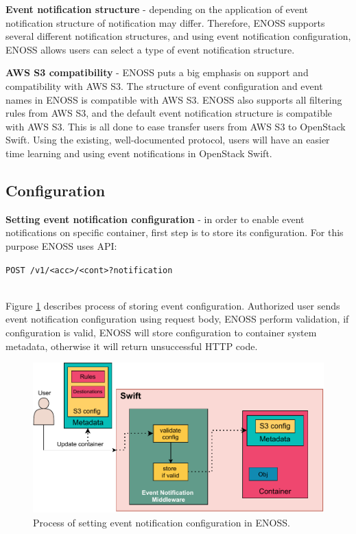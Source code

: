 \documentclass{ExcelAtFIT}
\begin{document}
\textbf{Event notification structure} - depending on the application of event notification structure of notification may differ. Therefore, ENOSS supports several different notification structures, and using event notification configuration, ENOSS allows users can select a type of event notification structure.

\textbf{AWS S3 compatibility} - ENOSS puts a big emphasis on support and compatibility with AWS S3. The structure of event configuration and event names in ENOSS is compatible with AWS S3. ENOSS also supports all filtering rules from AWS S3, and the default event notification structure is compatible with AWS S3. This is all done to ease transfer users from AWS S3 to OpenStack Swift. Using the existing, well-documented protocol,  users will have an easier time learning and using event notifications in OpenStack Swift.

\subsection{Configuration}

\textbf{Setting event notification configuration} - in order to enable event notifications on specific container, first step is to store its configuration. For this purpose ENOSS uses API: \\\centerline{\texttt{POST /v1/<acc>/<cont>?notification}}\\Figure \ref{fig:postConfiguration} describes process of storing event configuration. Authorized user sends event notification configuration using request body, ENOSS perform validation, if configuration is valid, ENOSS will store configuration to container system metadata, otherwise it will return unsuccessful HTTP code.

\begin{figure}[t]
		\centering
		\includegraphics[width=0.90\linewidth]{images/swift-postconfiguration.pdf}
		\caption{Process of setting event notification configuration in ENOSS.}
		\label{fig:postConfiguration}
\end{figure}
\end{document}
